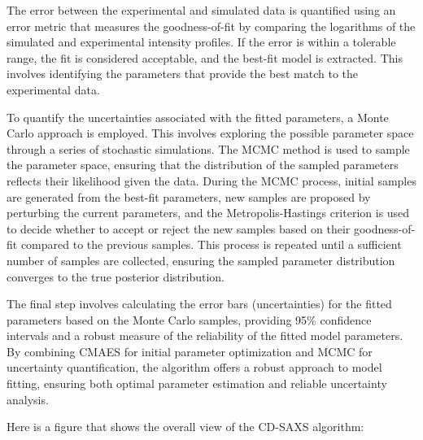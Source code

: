 \medskip

The error between the experimental and simulated data is quantified using an error metric that measures the goodness-of-fit by comparing the logarithms of the simulated and experimental intensity profiles. If the error is within a tolerable range, the fit is considered acceptable, and the best-fit model is extracted. This involves identifying the parameters that provide the best match to the experimental data.

\medskip

To quantify the uncertainties associated with the fitted parameters, a Monte Carlo approach is employed. This involves exploring the possible parameter space through a series of stochastic simulations. The MCMC method is used to sample the parameter space, ensuring that the distribution of the sampled parameters reflects their likelihood given the data. During the MCMC process, initial samples are generated from the best-fit parameters, new samples are proposed by perturbing the current parameters, and the Metropolis-Hastings criterion is used to decide whether to accept or reject the new samples based on their goodness-of-fit compared to the previous samples. This process is repeated until a sufficient number of samples are collected, ensuring the sampled parameter distribution converges to the true posterior distribution.

\medskip

The final step involves calculating the error bars (uncertainties) for the fitted parameters based on the Monte Carlo samples, providing 95\% confidence intervals and a robust measure of the reliability of the fitted model parameters. By combining CMAES for initial parameter optimization and MCMC for uncertainty quantification, the algorithm offers a robust approach to model fitting, ensuring both optimal parameter estimation and reliable uncertainty analysis.

\medskip

Here is a figure that shows the overall view of the CD-SAXS algorithm:

